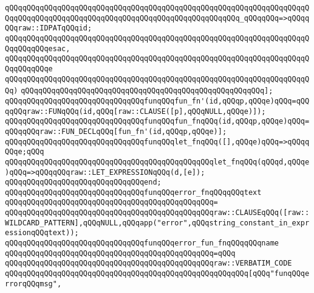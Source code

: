 \verb|qQQqqQQqqQQqqQQqqQQqqQQqqQQqqQQqqQQqqQQqqQQqqQQqqQQqqQQqqQQqqQQqqQQqqQQqqQQqqQQqqQQqqQQqqQQqqQQqqQQqqQQqqQQqqQQqqQQqqQQqqQQq_qQQqqQQq=>qQQqqQQqraw::IDPATqQQqid;|\newline
\verb|qQQqqQQqqQQqqQQqqQQqqQQqqQQqqQQqqQQqqQQqqQQqqQQqqQQqqQQqqQQqqQQqqQQqqQQqqQQqqQQqesac,|\newline
\verb|qQQqqQQqqQQqqQQqqQQqqQQqqQQqqQQqqQQqqQQqqQQqqQQqqQQqqQQqqQQqqQQqqQQqqQQqqQQqqQQqe|\newline
\verb|qQQqqQQqqQQqqQQqqQQqqQQqqQQqqQQqqQQqqQQqqQQqqQQqqQQqqQQqqQQqqQQqqQQqqQQq)|\newline
\verb|qQQqqQQqqQQqqQQqqQQqqQQqqQQqqQQqqQQqqQQqqQQqqQQqqQQqqQQq];|\newline
\newline
\verb|qQQqqQQqqQQqqQQqqQQqqQQqqQQqqQQqfunqQQqfun_fn'(id,qQQqp,qQQqe)qQQq=qQQqqQQqraw::FUNqQQq(id,qQQq[raw::CLAUSE([p],qQQqNULL,qQQqe)]);|\newline
\verb|qQQqqQQqqQQqqQQqqQQqqQQqqQQqqQQqfunqQQqfun_fnqQQq(id,qQQqp,qQQqe)qQQq=qQQqqQQqraw::FUN_DECLqQQq[fun_fn'(id,qQQqp,qQQqe)];|\newline
\newline
\verb|qQQqqQQqqQQqqQQqqQQqqQQqqQQqqQQqfunqQQqlet_fnqQQq([],qQQqe)qQQq=>qQQqqQQqe;qQQq|\newline
\verb|qQQqqQQqqQQqqQQqqQQqqQQqqQQqqQQqqQQqqQQqqQQqqQQqlet_fnqQQq(qQQqd,qQQqe)qQQq=>qQQqqQQqraw::LET_EXPRESSIONqQQq(d,[e]);|\newline
\verb|qQQqqQQqqQQqqQQqqQQqqQQqqQQqqQQqend;|\newline
\newline
\newline
\verb|qQQqqQQqqQQqqQQqqQQqqQQqqQQqqQQqfunqQQqerror_fnqQQqqQQqtext|\newline
\verb|qQQqqQQqqQQqqQQqqQQqqQQqqQQqqQQqqQQqqQQqqQQqqQQq=|\newline
\verb|qQQqqQQqqQQqqQQqqQQqqQQqqQQqqQQqqQQqqQQqqQQqqQQqraw::CLAUSEqQQq([raw::WILDCARD_PATTERN],qQQqNULL,qQQqapp("error",qQQqstring_constant_in_expressionqQQqtext));|\newline
\newline
\verb|qQQqqQQqqQQqqQQqqQQqqQQqqQQqqQQqfunqQQqerror_fun_fnqQQqqQQqname|\newline
\verb|qQQqqQQqqQQqqQQqqQQqqQQqqQQqqQQqqQQqqQQqqQQqqQQq=qQQq|\newline
\verb|qQQqqQQqqQQqqQQqqQQqqQQqqQQqqQQqqQQqqQQqqQQqqQQqraw::VERBATIM_CODE|\newline
\verb|qQQqqQQqqQQqqQQqqQQqqQQqqQQqqQQqqQQqqQQqqQQqqQQqqQQqqQQq[qQQq"funqQQqerrorqQQqmsg",|\newline
